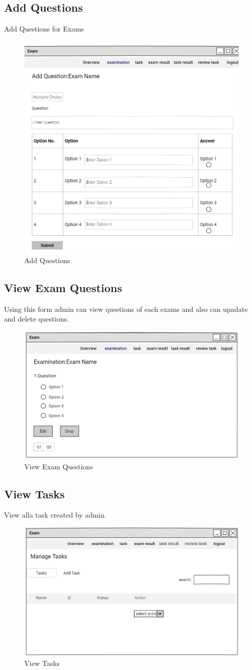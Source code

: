 \documentclass[a4paper,12pt]{report}
\begin{document}
\subsection {Add Questions}
Add Questions for Exams
\begin{figure}[bph]
	\centering
	\includegraphics[width=.5\linewidth]{img/admin/addexmqstn}
	\caption{Add Questions}
\end{figure}
\pagebreak
\subsection {View Exam  Questions}
Using this form admin can view questions of each exams and also can upadate and delete questions.
\begin{figure}[bph]
	\centering
	\includegraphics[width=.5\linewidth]{img/admin/viweexmqstn}
	\caption{View Exam  Questions}
\end{figure}


\pagebreak
\subsection { View Tasks}
View alla task created by admin.
\begin{figure}[bph]
	\centering
	\includegraphics[width=.55\linewidth]{img/admin/t1}
	\caption{ View Tasks}
\end{figure}
\pagebreak
\end{document}
